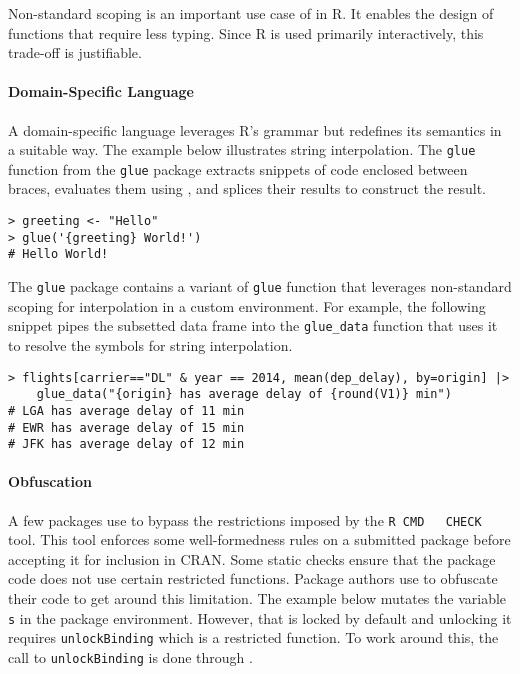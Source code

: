 \documentclass[acmsmall, screen]{acmart}
\renewcommand{\k}[1]{\lstinline |#1|\xspace}
\begin{document}
Non-standard scoping is an important use case of \eval in R. It enables the
design of functions that require less typing. Since R is used primarily
interactively, this trade-off is justifiable.

\paragraph{Domain-Specific Language}
A domain-specific language leverages R's grammar but redefines its semantics in
a suitable way. The example below illustrates string interpolation. The \k{glue}
function from the \k{glue} package extracts snippets of code enclosed between
braces, evaluates them using \eval, and splices their results to construct the
result.

\begin{lstlisting}[caption={\k{glue::glue}}, captionpos=b]
> greeting <- "Hello"
> glue('{greeting} World!')
# Hello World!
\end{lstlisting}\medskip

The \k{glue} package contains a variant of \k{glue} function that leverages
non-standard scoping for interpolation in a custom environment. For example, the
following snippet pipes the subsetted data frame into the \k{glue_data} function
that uses it to resolve the symbols for string interpolation.

\begin{lstlisting}[caption={\k{glue::glue_data}}, captionpos=b]
> flights[carrier=="DL" & year == 2014, mean(dep_delay), by=origin] |>
    glue_data("{origin} has average delay of {round(V1)} min")
# LGA has average delay of 11 min
# EWR has average delay of 15 min
# JFK has average delay of 12 min
\end{lstlisting}\medskip

\paragraph{Obfuscation}
A few packages use \eval to bypass the restrictions imposed by the \k{R CMD
  CHECK} tool. This tool enforces some well-formedness rules on a submitted
package before accepting it for inclusion in CRAN. Some static checks ensure
that the package code does not use certain restricted functions. Package authors
use \eval to obfuscate their code to get around this limitation. The example
below mutates the variable \k{s} in the package environment. However, that is
locked by default and unlocking it requires \k{unlockBinding} which is a
restricted function. To work around this, the call to \k{unlockBinding} is done
through \eval.
\end{document}
